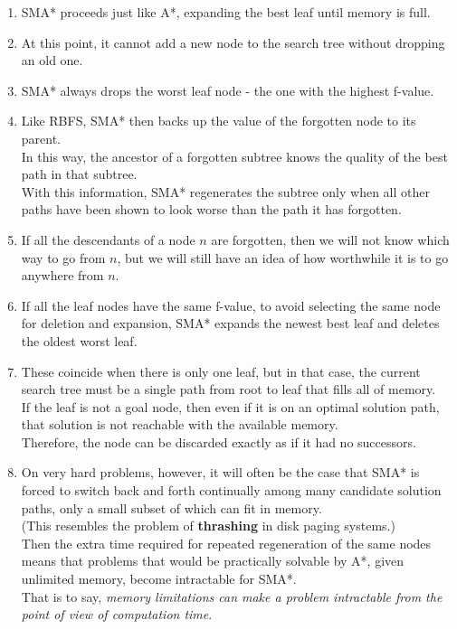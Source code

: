 \begin{enumerate}
    \item SMA* proceeds just like A*, expanding the best leaf until memory is full.

    \item At this point, it cannot add a new node to the search tree without dropping an old one.

    \item SMA* always drops the worst leaf node - the one with the highest f-value. 
    
    \item Like RBFS, SMA* then backs up the value of the forgotten node to its parent.\\
    In this way, the ancestor of a forgotten subtree knows the quality of the best path in that subtree.\\
    With this information, SMA* regenerates the subtree only when all other paths have been shown to look worse than the path it has forgotten. 
    
    \item If all the descendants of a node $n$ are forgotten, then we will not know which way to go from $n$, but we will still have an idea of how worthwhile it is to go anywhere from $n$.

    \item If all the leaf nodes have the same f-value, to avoid selecting the same node for deletion and expansion, SMA* expands the newest best leaf and deletes the oldest worst leaf.

    \item These coincide when there is only one leaf, but in that case, the current search tree must be a single path from root to leaf that fills all of memory.\\
    If the leaf is not a goal node, then even if it is on an optimal solution path, that solution is not reachable with the available memory.\\
    Therefore, the node can be discarded exactly as if it had no successors.

    \item On very hard problems, however, it will often be the case that SMA* is forced to switch back and forth continually among many candidate solution paths, only a small subset of which can fit in memory.\\
    (This resembles the problem of \textbf{thrashing} in disk paging systems.)\\
    Then the extra time required for repeated regeneration of the same nodes means that problems that would be practically solvable by A*, given unlimited memory, become intractable for SMA*.\\
    That is to say, \textit{memory limitations can make a problem intractable from the point of view of computation time}.
\end{enumerate}



